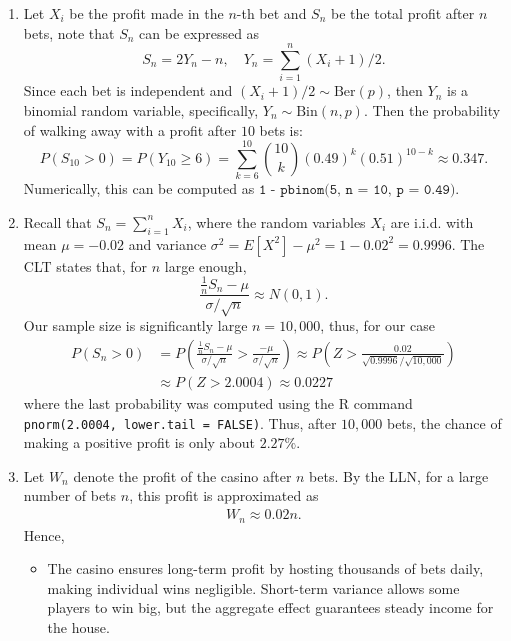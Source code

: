 \documentclass[12pt]{article}
\begin{document}
\begin{enumerate}
\begin{enumerate}
        \item Let $X_i$ be the profit made in the $n$-th bet and \( S_{n} \) be the total profit after $n$ bets, note that \(S_{n}\) can be expressed as
        $$
        S_n = 2Y_n - n,\quad Y_n = \sum_{i=1}^n(X_i + 1)/2.
        $$
        Since each bet is independent and $(X_i + 1)/2 \sim \text{Ber}(p)$, then $Y_n$ is a binomial random variable, specifically, $Y_n\sim\text{Bin}(n, p)$. Then the probability of walking away with a profit after $10$ bets is:
        \[
        P(S_{10} > 0) = P(Y_{10} \geq 6) = \sum_{k = 6}^{10} \binom{10}{k} (0.49)^k (0.51)^{10-k} \approx 0.347.
        \]
        Numerically, this can be computed as \(\texttt{1 - pbinom(5, n = 10, p = 0.49)}\).

        \item Recall that $S_n = \sum_{i=1}^n X_i$, where the random variables $X_i$ are i.i.d. with mean $\mu = -0.02$ and variance $\sigma^2 = E[X^2] - \mu^2 = 1 - 0.02^2 = 0.9996$. The CLT states that, for $n$ large enough,
        $$
        \frac{\frac{1}{n}S_n - \mu}{\sigma/\sqrt{n}} \approx N(0, 1).
        $$
        Our sample size is significantly large \( n = 10{,}000 \), thus, for our case
        \begin{align*}
            P(S_n > 0)
            &= P\left(\frac{\frac{1}{n}S_n - \mu}{\sigma/\sqrt{n}} > \frac{ - \mu}{\sigma/\sqrt{n}}\right) 
            \approx P\left(Z > \frac{0.02}{\sqrt{0.9996}/\sqrt{10{,}000}}\right) \\
            &\approx P(Z > 2.0004) \approx 0.0227
        \end{align*}
        where the last probability was computed using the R command \texttt{pnorm(2.0004, lower.tail = FALSE)}.
        Thus, after \(10{,}000\) bets, the chance of making a positive profit is only about $2.27\%$.
    
        \item Let $W_n$ denote the profit of the casino after $n$ bets. By the LLN, for a large number of bets $n$, this profit is approximated as
        \begin{align*}
            W_n \approx 0.02 n.
        \end{align*}
        Hence,
        \begin{itemize}
            \item[] The casino ensures long-term profit by hosting thousands of bets daily, making individual wins negligible. Short-term variance allows some players to win big, but the aggregate effect guarantees steady income for the house.
        \end{itemize}
    

\end{enumerate}
\end{enumerate}
\end{document}
